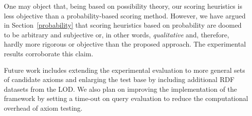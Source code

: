\documentclass{llncs}
\begin{document}
One may object that, being based on possibility theory, our scoring heuristics
is less objective than a probability-based scoring method. However, we have argued
in Section~\ref{probability} that scoring heuristics based on probability are doomed
to be arbitrary and subjective or, in other words, \emph{qualitative}
and, therefore, hardly more rigorous or objective than the proposed approach.
The experimental results corroborate this claim.

Future work includes extending the experimental evaluation to more general sets
of candidate axioms and enlarging the test base by including additional RDF datasets
from the LOD.
We also plan on improving the implementation of the framework by setting a time-out
on query evaluation to reduce the computational overhead of axiom testing.



\end{document}
